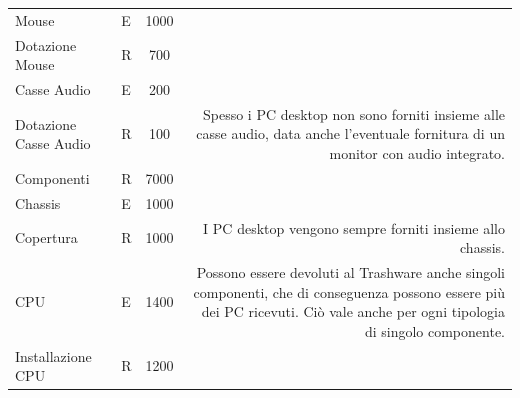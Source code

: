 \documentclass[a4paper,12pt]{report}
\begin{document}
\begin{table}[H]
\begin{threeparttable}
\begin{center}
\begin{tabular}{A|B|C|D}
                        & \\
                        \hline
                        Mouse
                        & E
                        & 1000
                        & \\
                        \hline
                        Dotazione Mouse
                        & R
                        & 700
                        & \\
                        \hline
                        Casse Audio
                        & E
                        & 200
                        & \\
                        \hline
                        Dotazione Casse Audio
                        & R
                        & 100
                        & Spesso i PC desktop non sono forniti insieme alle casse audio, data anche l'eventuale fornitura di un monitor con audio integrato.\\
                        \hline
                        Componenti
                        & R
                        & 7000
                        & \\
                        \hline
                        Chassis
                        & E
                        & 1000
                        & \\
                        \hline
                        Copertura
                        & R
                        & 1000
                        & I PC desktop vengono sempre forniti insieme allo chassis. \\
                        \hline
                        CPU
                        & E
                        & 1400
                        & Possono essere devoluti al Trashware anche singoli componenti, che di conseguenza possono essere più dei PC ricevuti. Ciò vale anche per ogni tipologia di singolo componente. \\
                        \hline
                        Installazione CPU
                        & R
                        & 1200
                        & \\

\end{tabular}
\end{center}
\end{threeparttable}
\end{table}
\end{document}
